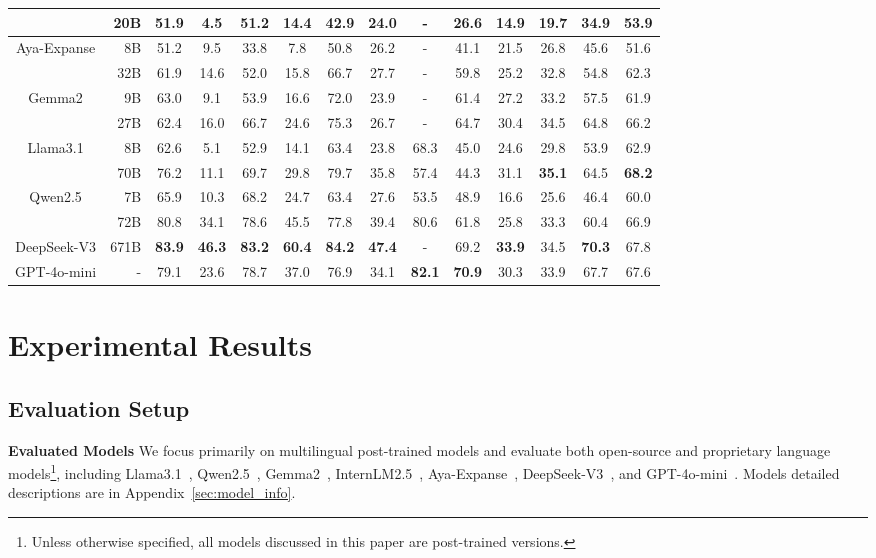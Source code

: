 \begin{table*}[ht]
\begin{tabular}{crcccccccccccc}
             & 20B & 51.9 & 4.5  & 51.2 & 14.4 & 42.9 & 24.0 & -    & 26.6 & 14.9 & 19.7 & 34.9 & 53.9 \\
        \midrule
        \multirow{2}{*}{Aya-Expanse}     & 8B  & 51.2 & 9.5  & 33.8 & 7.8  & 50.8 & 26.2 & -    & 41.1 & 21.5 & 26.8 & 45.6 & 51.6 \\
             & 32B & 61.9 & 14.6 & 52.0 & 15.8 & 66.7 & 27.7 & -    & 59.8 & 25.2 & 32.8 & 54.8 & 62.3 \\
        \midrule
        \multirow{2}{*}{Gemma2}          & 9B  & 63.0 & 9.1  & 53.9 & 16.6 & 72.0 & 23.9 & -    & 61.4 & 27.2 & 33.2 & 57.5 & 61.9 \\
                  & 27B & 62.4 & 16.0 & 66.7 & 24.6 & 75.3 & 26.7 & -    & 64.7 & 30.4 & 34.5 & 64.8 & 66.2 \\
        \midrule
        \multirow{2}{*}{Llama3.1}        & 8B  & 62.6 & 5.1  & 52.9 & 14.1 & 63.4 & 23.8 & 68.3 & 45.0 & 24.6 & 29.8 & 53.9 & 62.9 \\
                & 70B & 76.2 & 11.1 & 69.7 & 29.8 & 79.7 & 35.8 & 57.4 & 44.3 & 31.1 & \textbf{35.1} & 64.5 & \textbf{68.2} \\
        \midrule
        \multirow{2}{*}{Qwen2.5}         & 7B  & 65.9 & 10.3 & 68.2 & 24.7 & 63.4 & 27.6 & 53.5 & 48.9 & 16.6 & 25.6 & 46.4 & 60.0 \\
                 & 72B & 80.8 & 34.1 & 78.6 & 45.5 & 77.8 & 39.4 & 80.6 & 61.8 & 25.8 & 33.3 & 60.4 & 66.9 \\
        \midrule
        DeepSeek-V3 & 671B & \textbf{83.9} & \textbf{46.3} & \textbf{83.2} & \textbf{60.4} & \textbf{84.2} & \textbf{47.4} & - & 69.2 & \textbf{33.9} & 34.5 & \textbf{70.3} & 67.8 \\
        \midrule
        GPT-4o-mini     & -   & 79.1 & 23.6 & 78.7 & 37.0 & 76.9 & 34.1 & \textbf{82.1} & \textbf{70.9} & 30.3 & 33.9 & 67.7 & 67.6 \\
        \bottomrule
    \end{tabular}
\end{table*}

\section{Experimental Results}

\subsection{Evaluation Setup}

\noindent\textbf{Evaluated Models}
We focus primarily on multilingual post-trained models and evaluate both open-source and proprietary language models\footnote{Unless otherwise specified, all models discussed in this paper are post-trained versions.}, including Llama3.1~\cite{dubey2024llama}, Qwen2.5~\cite{qwen2.5}, Gemma2~\cite{team2024gemma}, InternLM2.5~\cite{cai2024internlm2}, Aya-Expanse~\cite{dang2024aya}, DeepSeek-V3~\cite{DeepSeekAI2024DeepSeekV3TR}, and GPT-4o-mini~\cite{openai2024gpt4o}.
Models detailed descriptions are in Appendix~\ref{sec:model_info}.

